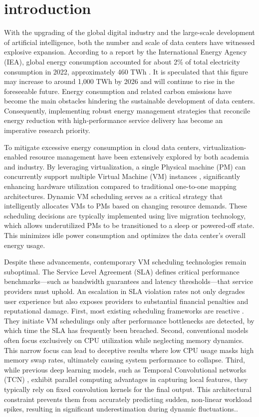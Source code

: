 \documentclass[conference]{{IEEEtran}}
\begin{document}
\section{introduction}
With the upgrading of the global digital industry and the large-scale development of artificial intelligence, both the number and scale of data centers have witnessed explosive expansion.  According to a report by the International Energy Agency (IEA), global energy consumption accounted for about 2\% of total electricity consumption in 2022, approximately 460 TWh \cite{zeng2022adaptive}. It is speculated that this figure may increase to around 1,000 TWh by 2026 and will continue to rise in the foreseeable future. Energy consumption and related carbon emissions have become the main obstacles hindering the sustainable development of data centers. Consequently, implementing robust energy management strategies that reconcile energy reduction with high-performance service delivery has become an imperative research priority.

To mitigate excessive energy consumption in cloud data centers, virtualization-enabled resource management have been extensively explored by both academia and industry. By leveraging virtualization, a single Physical machine (PM) can concurrently support multiple Virtual Machine (VM) instances \cite{mhedheb2013load}, significantly enhancing hardware utilization compared to traditional one-to-one mapping architectures. Dynamic VM scheduling serves as a critical  strategy that intelligently allocates VMs to PMs based on changing resource demands. These scheduling decisions are typically implemented using live migration technology, which allows underutilized PMs to be transitioned to a sleep or powered-off state. This minimizes idle power consumption and optimizes the data center’s overall energy usage.

Despite these advancements, contemporary VM scheduling technologies remain suboptimal. The Service Level Agreement (SLA) defines critical performance benchmarks—such as bandwidth guarantees and latency thresholds—that service providers must uphold. An escalation in SLA violation rates not only degrades user experience but also exposes providers to substantial financial penalties and reputational damage. First, most existing scheduling frameworks are reactive \cite{yang2024dual}. They initiate VM schedulings only after performance bottlenecks are detected, by which time the SLA has frequently been breached. Second, conventional models often focus exclusively on CPU utilization while neglecting memory dynamics. This narrow focus can lead to deceptive results where low CPU usage masks high memory swap rates, ultimately causing system performance to collapse. Third, while previous deep learning models, such as Temporal Convolutional networks (TCN) \cite{li2023tcn}, exhibit parallel computing advantages in capturing local features, they typically rely on fixed convolution kernels for the final output. This architectural constraint prevents them from accurately predicting sudden, non-linear workload spikes, resulting in significant underestimation during dynamic fluctuations..
\end{document}
